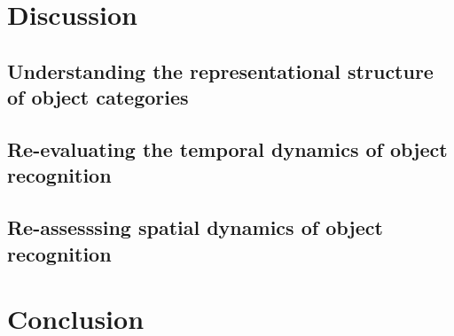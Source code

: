 \section{Discussion}
\subsection{Understanding the representational structure of object categories}
\subsection{Re-evaluating the temporal dynamics of object recognition}
\subsection{Re-assesssing spatial dynamics of object recognition}

\section{Conclusion}